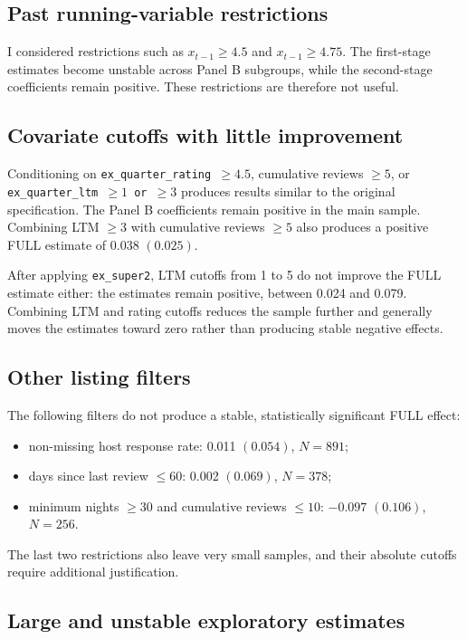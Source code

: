 \documentclass[12pt]{article}
\begin{document}
\subsection{Past running-variable restrictions}

I considered restrictions such as $x_{t-1}\geq 4.5$ and
$x_{t-1}\geq 4.75$. The first-stage estimates become unstable across Panel B
subgroups, while the second-stage coefficients remain positive. These
restrictions are therefore not useful.


\subsection{Covariate cutoffs with little improvement}

Conditioning on \texttt{ex\_quarter\_rating $\geq 4.5$}, cumulative reviews
$\geq 5$, or \texttt{ex\_quarter\_ltm $\geq 1$ or $\geq 3$} produces results
similar to the original specification. The Panel B coefficients remain
positive in the main sample. Combining LTM $\geq 3$ with cumulative reviews
$\geq 5$ also produces a positive FULL estimate of 0.038 $(0.025)$.

After applying \texttt{ex\_super2}, LTM cutoffs from 1 to 5 do not improve the
FULL estimate either: the estimates remain positive, between 0.024 and 0.079.
Combining LTM and rating cutoffs reduces the sample further and generally moves
the estimates toward zero rather than producing stable negative effects.


\subsection{Other listing filters}

The following filters do not produce a stable, statistically significant FULL
effect:
\begin{itemize}
    \item non-missing host response rate: 0.011 $(0.054)$, $N=891$;
    \item days since last review $\leq 60$: 0.002 $(0.069)$, $N=378$;
    \item minimum nights $\geq 30$ and cumulative reviews $\leq 10$:
    $-0.097$ $(0.106)$, $N=256$.
\end{itemize}
The last two restrictions also leave very small samples, and their absolute
cutoffs require additional justification.


\subsection{Large and unstable exploratory estimates}
\end{document}
